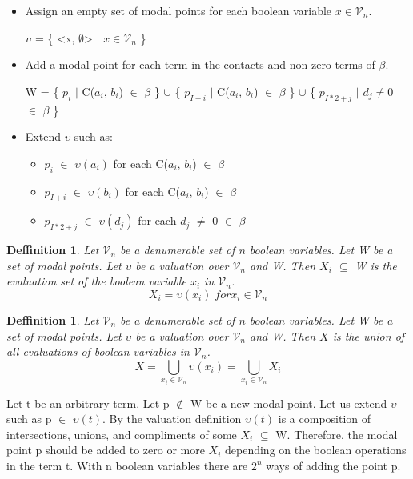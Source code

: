 \documentclass{article}
\newcommand\V{\mathcal{V}}
\newcommand\VXi{X_i}
\newcommand\VX{X}
\newtheorem{defn}[theorem]{Deffinition}
\begin{document}
		\begin{itemize}
			\item Assign an empty set of modal points for each boolean variable $x \in \V_n$.
	
			$\upsilon$ = \{ <x, $\emptyset$> $\mid$ $ x \in \V_n$ \}
			
			\item Add a modal point for each term in the contacts and non-zero terms of $\beta$. 
			
			W = \{ $p_i$ $\mid$ C($a_i$, $b_i$) $\in$ $\beta$ \} $\cup$ \{ $p_{I+i}$ $\mid$ C($a_i$, $b_i$) $\in$ $\beta$ \} $\cup$ \{ $p_{I*2+j}$ $\mid$ $d_j \neq 0$ $\in$ $\beta$ \}
						
			\item Extend $\upsilon$ such as:
			
			\begin{itemize}
				\item $p_i$ $\in$ $\upsilon(a_i)$ for each C($a_i$, $b_i$) $\in$ $\beta$ 
				\item $p_{I+i}$ $\in$ $\upsilon(b_i)$ for each C($a_i$, $b_i$) $\in$ $\beta$ 
				\item $p_{I*2+j}$ $\in$ $\upsilon(d_j)$ for each $d_j$  $\neq$ 0 $\in$ $\beta$ 
			\end{itemize}
		\end{itemize}
				
		\begin{defn}
			Let $\V_n$ be a denumerable set of $n$ boolean variables. Let W be a set of modal points. Let $\upsilon$ be a valuation over $\V_n$ and W. Then $\VXi$ $\subseteq$ W is the evaluation set of the boolean variable $x_i$ in $\V_n$.
			\begin{equation}
				\VXi = \upsilon(x_i) \;for x_i \in \V_n
			\end{equation}
		\end{defn}
		
		\begin{defn}
			Let $\V_n$ be a denumerable set of $n$ boolean variables. Let W be a set of modal points. Let $\upsilon$ be a valuation over $\V_n$ and W.
			Then $\VX$ is the union of all evaluations of boolean variables in $\V_n$.
			\begin{equation}
				\VX = \bigcup\limits_{x_i \in \V_n}\upsilon(x_i) = \bigcup\limits_{x_i \in \V_n}\VXi
			\end{equation}
		\end{defn}
		
		Let t be an arbitrary term. Let p $\notin$ W be a new modal point. Let us extend $\upsilon$ such as p $\in$ $\upsilon(t)$. By the valuation definition  $\upsilon(t)$ is a composition of intersections, unions, and compliments of some $\VXi$ $\subseteq$ W. Therefore, the modal point p should be added to zero or more $\VXi$ depending on the boolean operations in the term t. With n boolean variables there are $2^n$ ways of adding the point p.
		
\end{document}
